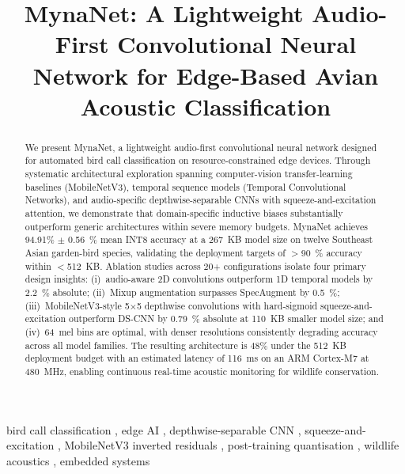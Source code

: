 \documentclass[final,5p,times,twocolumn,nolinenum]{elsarticle}
\begin{document}
\begin{frontmatter}

\title{MynaNet: A Lightweight Audio-First Convolutional Neural Network for
       Edge-Based Avian Acoustic Classification}



\begin{abstract}
We present MynaNet, a lightweight audio-first convolutional neural
network designed for automated bird call classification on
resource-constrained edge devices. Through systematic architectural
exploration spanning computer-vision transfer-learning baselines
(MobileNetV3), temporal sequence models (Temporal Convolutional Networks),
and audio-specific depthwise-separable CNNs with squeeze-and-excitation
attention, we demonstrate that domain-specific inductive biases
substantially outperform generic architectures within severe memory
budgets. MynaNet achieves \num[round-mode=places,round-precision=2]{94.91}\%
$\pm$ \SI{0.56}{\percent} mean INT8 accuracy at a \SI{267}{KB} model size
on twelve Southeast Asian garden-bird species, validating the deployment
targets of $>$\SI{90}{\percent} accuracy within $<$\SI{512}{KB}. Ablation
studies across 20+ configurations isolate four primary design insights:
(i)~audio-aware 2D convolutions outperform 1D temporal models by
\SI{2.2}{\percent} absolute; (ii)~Mixup augmentation surpasses SpecAugment
by \SI{0.5}{\percent}; (iii)~MobileNetV3-style 5$\times$5 depthwise
convolutions with hard-sigmoid squeeze-and-excitation outperform DS-CNN by
\SI{0.79}{\percent} absolute at \SI{110}{KB} smaller model size; and
(iv)~64~mel bins are optimal, with denser resolutions consistently degrading
accuracy across all model families. The resulting architecture is 48\% under
the \SI{512}{KB} deployment budget with an estimated latency of \SI{116}{ms}
on an ARM Cortex-M7 at \SI{480}{MHz}, enabling continuous real-time acoustic
monitoring for wildlife conservation.
\end{abstract}

\begin{keyword}
bird call classification \sep
edge AI \sep
depthwise-separable CNN \sep
squeeze-and-excitation \sep
MobileNetV3 inverted residuals \sep
post-training quantisation \sep
wildlife acoustics \sep
embedded systems
\end{keyword}

\end{frontmatter}
\end{document}
